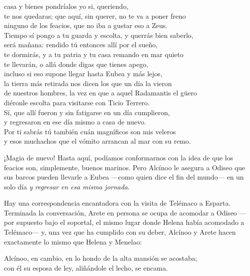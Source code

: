 \begin{versocita}
[...] casa y bienes pondríalos yo si, queriendo,\\
te nos quedaras; que aquí, sin querer, no te va a poner freno\\
ninguno de los feacios, que no iba a gustar eso a Zeus.\\
Tiempo sí pongo a tu guarda y escolta, y querrás bien saberlo,\\
será mañana: rendido tú entonces allí por el sueño,\\
te dormirás, y a tu patria y tu casa remando en mar quieto\\
te llevarán, o allá donde digas que tienes apego,\\
incluso si eso supone llegar hasta Eubea y más lejos,\\
la tierra más retirada nos dicen los que un día la vieron\\
de nuestros hombres, la vez en que a aquel Radamantis el güero\\
diéronle escolta para visitarse con Ticio Terrero.\\
Sí, que allí fueron y sin fatigarse en un día cumplieron,\\
y regresaron en ese día mismo a casa de nuevo.\\
Por ti sabrás tú también cuán magníficos son mis veleros\\
y esos muchachos que el vómito arrancan al mar con su remo.
\end{versocita}

¡Magia de nuevo! Hasta aquí, podíamos conformarnos con la idea de que los feacios son, simplemente, buenos marinos. Pero Alcínoo le asegura a Odiseo que sus barcos pueden llevarle a Eubea ---como quien dice el fin del mundo--- en un solo día \emph{y regresar en esa misma jornada}.

Hay una correspondencia encantadora con la visita de Telémaco a Esparta. Terminada la conversación, Arete en persona se ocupa de acomodar a Odiseo ---por supuesto bajo el soportal, el mismo lugar donde Helena había acomodado a Telémaco--- y, una vez que ha cumplido con su deber, Alcínoo y Arete hacen exactamente lo mismo que Helena y Menelao:

\begin{versocita}
Alcínoo, en cambio, en lo hondo de la alta mansión se acostaba;\\
con él su esposa de ley, aliñándole el lecho, se encama.
\end{versocita}


